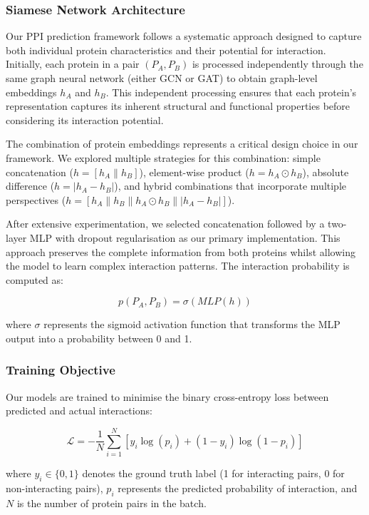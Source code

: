 \documentclass[12pt,a4paper]{article}
\begin{document}
\subsubsection{Siamese Network Architecture}

Our PPI prediction framework follows a systematic approach designed to capture both individual protein characteristics and their potential for interaction. Initially, each protein in a pair $(P_A, P_B)$ is processed independently through the same graph neural network (either GCN or GAT) to obtain graph-level embeddings $h_A$ and $h_B$. This independent processing ensures that each protein's representation captures its inherent structural and functional properties before considering its interaction potential.

The combination of protein embeddings represents a critical design choice in our framework. We explored multiple strategies for this combination: simple concatenation ($h = [h_A \| h_B]$), element-wise product ($h = h_A \odot h_B$), absolute difference ($h = |h_A - h_B|$), and hybrid combinations that incorporate multiple perspectives ($h = [h_A \| h_B \| h_A \odot h_B \| |h_A - h_B|]$).

After extensive experimentation, we selected concatenation followed by a two-layer MLP with dropout regularisation as our primary implementation. This approach preserves the complete information from both proteins whilst allowing the model to learn complex interaction patterns. The interaction probability is computed as:

\begin{equation}
    p(P_A, P_B) = \sigma(MLP(h))
\end{equation}

where $\sigma$ represents the sigmoid activation function that transforms the MLP output into a probability between 0 and 1.

\subsubsection{Training Objective}

Our models are trained to minimise the binary cross-entropy loss between predicted and actual interactions:

\begin{equation}
    \mathcal{L} = -\frac{1}{N}\sum_{i=1}^{N} [y_i \log(p_i) + (1-y_i) \log(1-p_i)]
\end{equation}

where $y_i \in \{0, 1\}$ denotes the ground truth label (1 for interacting pairs, 0 for non-interacting pairs), $p_i$ represents the predicted probability of interaction, and $N$ is the number of protein pairs in the batch.
\end{document}
